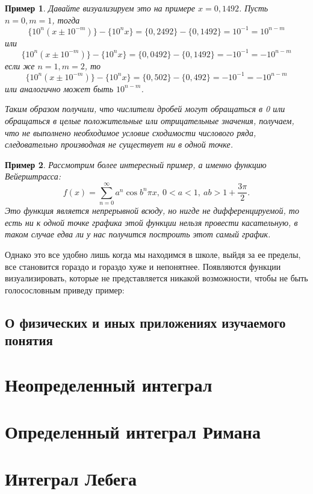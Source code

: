 \documentclass{book} %
\newtheorem{example}{Пример}[chapter] %
\theoremstyle{definition}
\theoremstyle{remark}
\begin{document}
\begin{example}
			Давайте визуализируем это на примере $x = 0,1492$. Пусть $n=0, m=1$, тогда
			\begin{equation*}
				\{10^n(x \pm 10^{-m})\} - \{10^nx\} = \{0,2492\} - \{0,1492\} = 10^{-1} = 10^{n-m}
			\end{equation*}
			или 
			\begin{equation*}
				\{10^n(x \pm 10^{-m})\} - \{10^nx\} = \{0,0492\} - \{0,1492\} = -10^{-1} = -10^{n-m}
			\end{equation*}
			если же $n = 1, m = 2$, то
			\begin{equation*}
				\{10^n(x \pm  10^{-m})\} - \{10^nx\} = \{0,502\} - \{0,492\} = -10^{-1} = -10^{n-m}
			\end{equation*}
			или аналогично может быть $10^{n-m}$.
			
			Таким образом получили, что числители дробей могут обращаться в 0 или обращаться в целые положительные или отрицательные значения, получаем, что не выполнено необходимое условие сходимости числового ряда, следовательно производная не существует ни в одной точке.
		\end{example}
		\begin{example}
		Рассмотрим более интересный пример, а именно функцию Вейерштрасса:
		\begin{equation*}
			f(x) = \sum\limits_{n=0}^{\infty} a^n \cos{b^n \pi x}, \ 0 < a < 1, \ ab > 1 + \dfrac{3\pi}2.
		\end{equation*}
		Это функция является непрерывной всюду, но нигде не дифференцируемой, то есть ни к одной точке графика этой функции нельзя провести касательную, в таком случае едва ли у нас получится построить этот самый график.
		\end{example}
		
		
		Однако это все удобно лишь когда мы находимся в школе, выйдя за ее пределы, все становится гораздо и гораздо хуже и непонятнее. Появляются функции визуализировать, которые не представляется никакой возможности, чтобы не быть голосословным приведу пример:
	\section{О физических и иных приложениях изучаемого понятия}

		
	\chapter{Неопределенный интеграл}
	
	\chapter{Определенный интеграл Римана}

	\chapter{Интеграл Лебега}
	
	
\end{document}
